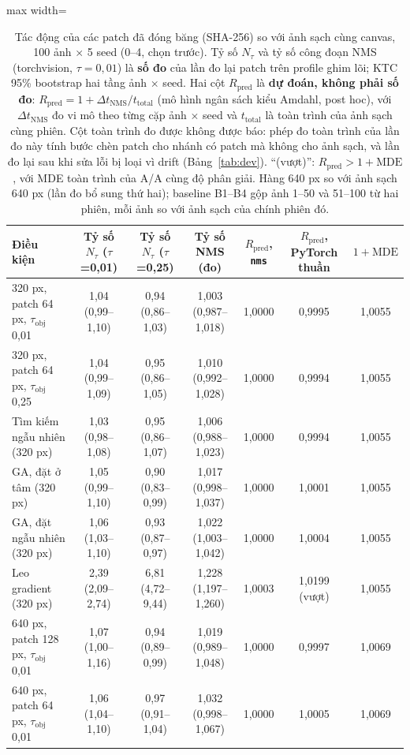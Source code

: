 \documentclass[a4paper,fleqn]{cas-dc}
\newcommand{\Ntau}{N_{\tau}}
\begin{document}
\begin{table}[!tp]
\centering\small
\caption{Tác động của các patch đã đóng băng (SHA-256) so với ảnh sạch cùng canvas, 100 ảnh $\times$ 5 seed (0--4, chọn trước). Tỷ số $\Ntau$ và tỷ số công đoạn NMS (torchvision, $\tau=0{,}01$) là \textbf{số đo} của lần đo lại patch trên profile ghim lõi; KTC 95\% bootstrap hai tầng ảnh $\times$ seed. Hai cột $R_{\mathrm{pred}}$ là \textbf{dự đoán, không phải số đo}: $R_{\mathrm{pred}} = 1 + \Delta t_{\mathrm{NMS}}/t_{\mathrm{total}}$ (mô hình ngân sách kiểu Amdahl, post hoc), với $\Delta t_{\mathrm{NMS}}$ đo vi mô theo từng cặp ảnh $\times$ seed và $t_{\mathrm{total}}$ là toàn trình của ảnh sạch cùng phiên. Cột toàn trình đo được không được báo: phép đo toàn trình của lần đo này tính bước chèn patch cho nhánh có patch mà không cho ảnh sạch, và lần đo lại sau khi sửa lỗi bị loại vì drift (Bảng~\ref{tab:dev}). ``(vượt)'': $R_{\mathrm{pred}} > 1+\mathrm{MDE}$, với MDE toàn trình của A/A cùng độ phân giải. Hàng 640 px so với ảnh sạch 640 px (lần đo bổ sung thứ hai); baseline B1--B4 gộp ảnh 1--50 và 51--100 từ hai phiên, mỗi ảnh so với ảnh sạch của chính phiên đó.}
\label{tab:patches}
\begin{adjustbox}{max width=\textwidth}
\begin{tabular}{@{}lcccccc@{}}
\toprule
Điều kiện & Tỷ số $\Ntau$ ($\tau$=0,01) & Tỷ số $\Ntau$ ($\tau$=0,25) & Tỷ số NMS (đo) & $R_{\mathrm{pred}}$, \texttt{nms} & $R_{\mathrm{pred}}$, PyTorch thuần & $1+\mathrm{MDE}$ \\
\midrule
320 px, patch 64 px, $\tau_{\mathrm{obj}}$ 0,01 & 1,04 (0,99--1,10) & 0,94 (0,86--1,03) & 1,003 (0,987--1,018) & 1,0000 & 0,9995 & 1,0055 \\
320 px, patch 64 px, $\tau_{\mathrm{obj}}$ 0,25 & 1,04 (0,99--1,09) & 0,95 (0,86--1,05) & 1,010 (0,992--1,028) & 1,0000 & 0,9994 & 1,0055 \\
Tìm kiếm ngẫu nhiên (320 px) & 1,03 (0,98--1,08) & 0,95 (0,86--1,07) & 1,006 (0,988--1,023) & 1,0000 & 0,9994 & 1,0055 \\
GA, đặt ở tâm (320 px) & 1,05 (0,99--1,10) & 0,90 (0,83--0,99) & 1,017 (0,998--1,037) & 1,0000 & 1,0001 & 1,0055 \\
GA, đặt ngẫu nhiên (320 px) & 1,06 (1,03--1,10) & 0,93 (0,87--0,97) & 1,022 (1,003--1,042) & 1,0000 & 1,0004 & 1,0055 \\
Leo gradient (320 px) & 2,39 (2,09--2,74) & 6,81 (4,72--9,44) & 1,228 (1,197--1,260) & 1,0003 & 1,0199 (vượt) & 1,0055 \\
640 px, patch 128 px, $\tau_{\mathrm{obj}}$ 0,01 & 1,07 (1,00--1,16) & 0,94 (0,89--0,99) & 1,019 (0,989--1,048) & 1,0000 & 0,9997 & 1,0069 \\
640 px, patch 64 px, $\tau_{\mathrm{obj}}$ 0,01 & 1,06 (1,04--1,10) & 0,97 (0,91--1,04) & 1,032 (0,998--1,067) & 1,0000 & 1,0005 & 1,0069 \\
\bottomrule
\end{tabular}
\end{adjustbox}
\end{table}
\end{document}
